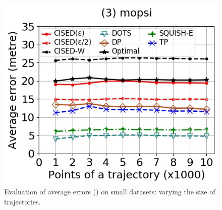{\begin{figure}[tb!]
	\includegraphics[scale=0.348]{Figures/Exp-SED-error-size-mopsi.jpg}		
	\vspace{-2ex}
	\caption{\small Evaluation of average errors (\sed) on small datasets: varying the size of
		trajectories.}
	\label{fig:ae-sed-size}
	\vspace{-2ex}
\end{figure}


}
